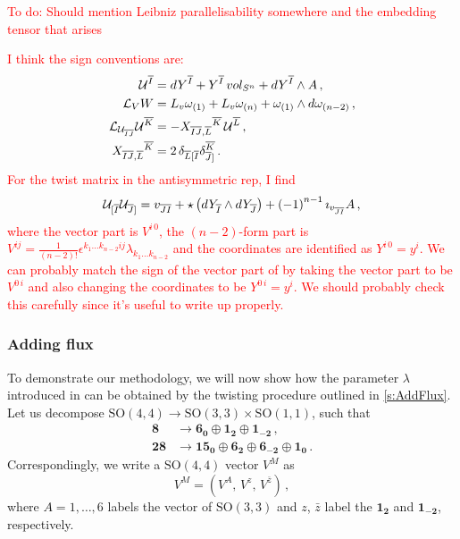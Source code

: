 \documentclass[a4paper, 11pt]{article}
\numberwithin{equation}{section}
\newcommand{\ov}[1]{\overline{#1}}
\newcommand{\SO}[1]{\mathrm{SO}( #1 )}
\newcommand{\+}{\oplus}
\newcommand{\gL}{\mathcal{L}}
\newcommand{\cU}{{\cal U}}
\newcommand{\fl}[1]{\ov{#1}}
\newcommand{\EM}[1]{\textcolor{red}{#1}}
\begin{document}
\EM{To do: Should mention Leibniz parallelisability somewhere and the embedding tensor that arises}

\EM{I think the sign conventions are:
	\begin{equation}
		\begin{split}
			\cU^{\fl{I}} &= dY^{\fl{I}} + Y^{\fl{I}}\, vol_{S^n} + dY^{\fl{I}} \wedge A \,, \\
			\gL_{V} W &= L_v \omega_{(1)} + L_v \omega_{(n)} + \omega_{(1)} \wedge d\omega_{(n-2)} \,, \\
			\gL_{\cU_{\fl{I}\fl{J}}} \cU^{\fl{K}} &= - X_{\fl{I}\fl{J},\fl{L}}{}^{\fl{K}}\, \cU^{\fl{L}} \,, \\
			X_{\fl{I}\fl{J},\fl{L}}{}^{\fl{K}} &= 2\, \delta_{\fl{L}[\fl{I}} \delta_{\fl{J}]}^{\fl{K}} \,.
		\end{split}
	\end{equation}
For the twist matrix in the antisymmetric rep, I find
\begin{equation}
	\cU_{[\fl{I}} \cU_{\fl{J}]} = v_{\fl{J}\fl{I}} + \star \left( dY_{\fl{I}} \wedge dY_{\fl{J}} \right) + \left(-1\right)^{n-1} \imath_{v_{\fl{J}\fl{I}}} A \,,
\end{equation}
where the vector part is $V^{i\,0}$, the $(n-2)$-form part is $V^{ij} = \frac{1}{(n-2)!} \epsilon^{k_1 \ldots k_{n-2} ij} \lambda_{k_{1} \ldots k_{n-2}}$ and the coordinates are identified as $Y^{i\,0} = y^i$. We can probably match the sign of the vector part of \cite{Baguet:2015iou} by taking the vector part to be $V^{0\,i}$ and also changing the coordinates to be $Y^{0\,i} = y^i$. We should probably check this carefully since it's useful to write up properly.
}

\subsubsection{Adding flux}
To demonstrate our methodology, we will now show how the parameter $\lambda$ introduced in \cite{Eloy:2021fhc} can be obtained by the twisting procedure outlined in \ref{s:AddFlux}. Let us decompose $\SO{4,4} \rightarrow \SO{3,3} \times \SO{1,1}$, such that
\begin{equation}
	\begin{split}
		\mathbf{8} &\rightarrow \mathbf{6_0} \oplus \mathbf{1_2} \oplus \mathbf{1_{-2}} \,, \\
		\mathbf{28} &\rightarrow \mathbf{15_0} \oplus \mathbf{6_2} \oplus \mathbf{6_{-2}} \oplus \mathbf{1_0} \,.
	\end{split}
\end{equation}
Correspondingly, we write a $\SO{4,4}$ vector $V^M$ as
\begin{equation}
	V^M = \left( V^A,\, V^z,\, V^{\bar{z}} \right) \,,
\end{equation}
where $A = 1, \ldots, 6$ labels the vector of $\SO{3,3}$ and $z$, $\bar{z}$ label the $\mathbf{1_2}$ and $\mathbf{1_{-2}}$, respectively.
\end{document}
